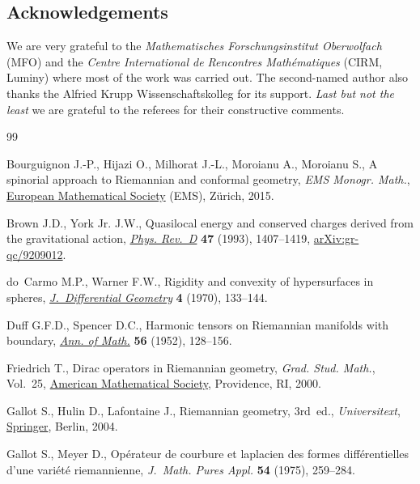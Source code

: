 \documentclass[pdftex]{sigma}
\numberwithin{equation}{section}
\begin{document}
\subsection*{Acknowledgements} We are very grateful to the \emph{Mathematisches For\-schungs\-in\-sti\-tut Oberwolfach} (MFO) and the \emph{Centre International de Rencontres Ma\-th\'e\-ma\-ti\-ques} (CIRM, Luminy) where most of the work was carried out.
The second-named author also thanks the Alfried Krupp Wissenschaftskolleg for its support.
{\it Last but not the least} we are grateful to the referees for their constructive comments.

\begin{thebibliography}{99}
\footnotesize\itemsep=0pt

Bourguignon J.-P., Hijazi O., Milhorat J.-L., Moroianu A., Moroianu S., A
  spinorial approach to {R}iemannian and conformal geometry, \textit{EMS Monogr. Math.},
  \href{https://doi.org/10.4171/136}{European Mathematical Society} (EMS), Z\"urich, 2015.

Brown J.D., York Jr. J.W., Quasilocal energy and conserved charges derived from
  the gravitational action, \href{https://doi.org/10.1103/PhysRevD.47.1407}{\textit{Phys. Rev.~D}} \textbf{47} (1993),
  1407--1419, \href{https://arxiv.org/abs/gr-qc/9209012}{arXiv:gr-qc/9209012}.

do~Carmo M.P., Warner F.W., Rigidity and convexity of hypersurfaces in spheres,
  \href{https://doi.org/10.4310/jdg/1214429378}{\textit{J.~Differential Geometry}} \textbf{4} (1970), 133--144.

Duff G.F.D., Spencer D.C., Harmonic tensors on {R}iemannian manifolds with
  boundary, \href{https://doi.org/10.2307/1969771}{\textit{Ann. of Math.}} \textbf{56} (1952), 128--156.

Friedrich T., Dirac operators in {R}iemannian geometry, \textit{Grad. Stud.
  Math.}, Vol.~25, \href{https://doi.org/10.1090/gsm/025}{American Mathematical Society}, Providence, RI, 2000.

Gallot S., Hulin D., Lafontaine J., Riemannian geometry, 3rd~ed., \textit{Universitext},
  \href{https://doi.org/10.1007/978-3-642-18855-8}{Springer}, Berlin, 2004.

Gallot S., Meyer D., Op\'erateur de courbure et laplacien des formes
  diff\'erentielles d'une vari\'et\'e riemannienne, \textit{J.~Math. Pures
  Appl.} \textbf{54} (1975), 259--284.


\end{thebibliography}
\end{document}
